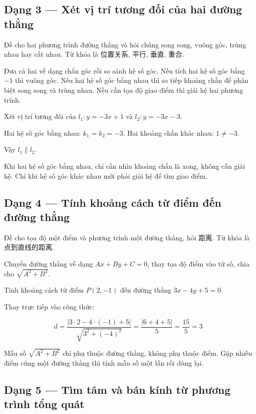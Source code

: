 \documentclass[11pt, a4paper]{article}
\begin{document}
\subsection{Dạng 3 — Xét vị trí tương đối của hai đường thẳng}

 Đề cho hai phương trình đường thẳng và hỏi chúng song song, vuông góc, trùng nhau hay cắt nhau. Từ khóa là 位置关系, 平行, 垂直, 重合.

 Đưa cả hai về dạng chắn góc rồi so sánh hệ số góc. Nếu tích hai hệ số góc bằng $-1$ thì vuông góc. Nếu hai hệ số góc bằng nhau thì so tiếp khoảng chắn để phân biệt song song và trùng nhau. Nếu cần tọa độ giao điểm thì giải hệ hai phương trình.

\begin{vidu}[{3}]
Xét vị trí tương đối của $l_1: y = -3x + 1$ và $l_2: y = -3x - 3$.

Hai hệ số góc bằng nhau: $k_1 = k_2 = -3$. Hai khoảng chắn khác nhau: $1 \ne -3$.

Vậy $l_1 \parallel l_2$.

 Khi hai hệ số góc bằng nhau, chỉ cần nhìn khoảng chắn là xong, không cần giải hệ. Chỉ khi hệ số góc khác nhau mới phải giải hệ để tìm giao điểm.

\end{vidu}
\subsection{Dạng 4 — Tính khoảng cách từ điểm đến đường thẳng}

 Đề cho tọa độ một điểm và phương trình một đường thẳng, hỏi 距离. Từ khóa là 点到直线的距离.

 Chuyển đường thẳng về dạng $Ax + By + C = 0$, thay tọa độ điểm vào tử số, chia cho $\sqrt{A^2 + B^2}$.

\begin{vidu}[{4}]
Tính khoảng cách từ điểm $P(2, -1)$ đến đường thẳng $3x - 4y + 5 = 0$.

Thay trực tiếp vào công thức:

$$d = \frac{|3 \cdot 2 - 4 \cdot (-1) + 5|}{\sqrt{3^2 + (-4)^2}} = \frac{|6 + 4 + 5|}{5} = \frac{15}{5} = 3$$

 Mẫu số $\sqrt{A^2 + B^2}$ chỉ phụ thuộc đường thẳng, không phụ thuộc điểm. Gặp nhiều điểm cùng một đường thẳng thì tính mẫu số một lần rồi dùng lại.

\end{vidu}
\subsection{Dạng 5 — Tìm tâm và bán kính từ phương trình tổng quát}
\end{document}

